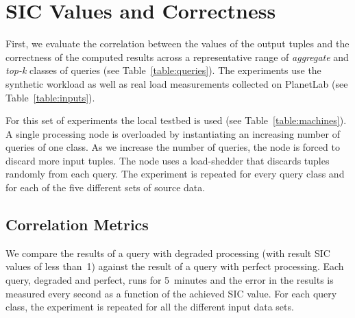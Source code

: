 \vspace{-10pt}
\section{SIC Values and Correctness}

First, we evaluate the correlation between the \sic values of the output tuples and the correctness of
the computed results across a representative range of \emph{aggregate} and \emph{top-k} classes of
queries (see Table~\ref{table:queries}). 
The experiments use the synthetic workload as well as real load measurements collected on PlanetLab
(see Table~\ref{table:inputs}).
% 
%

For this set of experiments the local testbed is used (see Table~\ref{table:machines}). A single \sys
processing node is overloaded by instantiating an increasing number of queries of one class. As we increase the number of queries, the node is forced to discard
more input tuples. The node uses a load-shedder that discards tuples randomly from each query.
The experiment is repeated for every query class and for each of the five different sets of source data. 
\vspace{-10pt}
\subsection*{Correlation Metrics}

We compare the results of a query with degraded processing (\ie with result SIC values of less
than~1) against the result of a query with perfect processing. Each query, degraded and perfect, runs
for 5~minutes and the error in the results is measured every second as a function of the achieved SIC
value. For each query class, the experiment is repeated for all the different input data sets.

